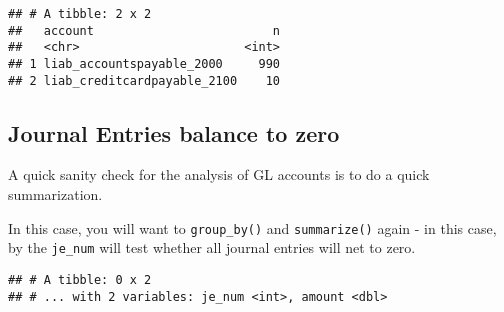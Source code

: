 \documentclass[
]{book}
\newenvironment{Shaded}{\begin{snugshade}}{\end{snugshade}}
\newcommand{\CommentTok}[1]{\textcolor[rgb]{0.56,0.35,0.01}{\textit{#1}}}
\newcommand{\DataTypeTok}[1]{\textcolor[rgb]{0.13,0.29,0.53}{#1}}
\newcommand{\DecValTok}[1]{\textcolor[rgb]{0.00,0.00,0.81}{#1}}
\newcommand{\KeywordTok}[1]{\textcolor[rgb]{0.13,0.29,0.53}{\textbf{#1}}}
\newcommand{\NormalTok}[1]{#1}
\newcommand{\OperatorTok}[1]{\textcolor[rgb]{0.81,0.36,0.00}{\textbf{#1}}}
\newcommand{\StringTok}[1]{\textcolor[rgb]{0.31,0.60,0.02}{#1}}
\begin{document}
\begin{Shaded}
\end{Shaded}

\begin{verbatim}
## # A tibble: 2 x 2
##   account                         n
##   <chr>                       <int>
## 1 liab_accountspayable_2000     990
## 2 liab_creditcardpayable_2100    10
\end{verbatim}

\hypertarget{journal-entries-balance-to-zero}{%
\subsection{Journal Entries balance to zero}\label{journal-entries-balance-to-zero}}

A quick sanity check for the analysis of GL accounts is to do a quick summarization.

In this case, you will want to \texttt{group\_by()} and \texttt{summarize()} again - in this case, by the \texttt{je\_num} will test whether all journal entries will net to zero.

\begin{Shaded}
\end{Shaded}

\begin{verbatim}
## # A tibble: 0 x 2
## # ... with 2 variables: je_num <int>, amount <dbl>
\end{verbatim}
\end{document}
